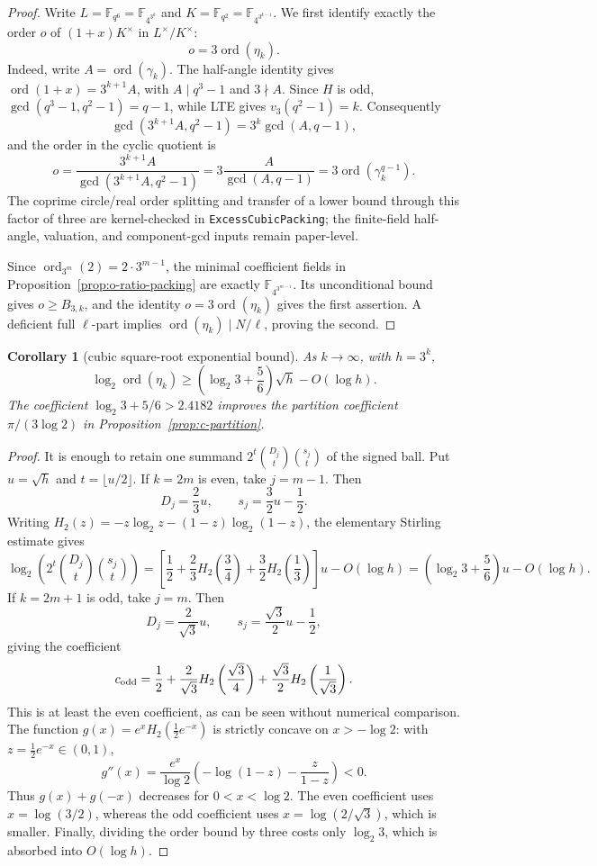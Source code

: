 \documentclass[11pt]{article}
\newtheorem{corollary}[theorem]{Corollary}
\theoremstyle{definition}
\theoremstyle{remark}
\begin{document}
\begin{proof}
Write $L=\mathbb F_{q^6}=\mathbb F_{4^{3^k}}$ and
$K=\mathbb F_{q^2}=\mathbb F_{4^{3^{k-1}}}$.  We first identify exactly
the order $o$ of $(1+x)K^\times$ in $L^\times/K^\times$:
\[
 o=3\operatorname{ord}(\eta_k).
\]
Indeed, write $A=\operatorname{ord}(\gamma_k)$.  The half-angle identity
gives $\operatorname{ord}(1+x)=3^{k+1}A$, with
$A\mid q^3-1$ and $3\nmid A$.  Since $H$ is odd,
$\gcd(q^3-1,q^2-1)=q-1$, while LTE gives
$v_3(q^2-1)=k$.  Consequently
\[
 \gcd(3^{k+1}A,q^2-1)=3^k\gcd(A,q-1),
\]
and the order in the cyclic quotient is
\[
 o=\frac{3^{k+1}A}{\gcd(3^{k+1}A,q^2-1)}
   =3\frac A{\gcd(A,q-1)}
   =3\operatorname{ord}(\gamma_k^{q-1}).
\]
The coprime circle/real order splitting and transfer of a lower bound
through this factor of three are kernel-checked in
\texttt{ExcessCubicPacking}; the finite-field half-angle, valuation, and
component-gcd inputs remain paper-level.

Since $\operatorname{ord}_{3^m}(2)=2\cdot3^{m-1}$, the minimal
coefficient fields in Proposition~\ref{prop:o-ratio-packing} are exactly
$\mathbb F_{4^{3^{m-1}}}$.  Its unconditional bound gives
$o\geq B_{3,k}$, and the identity $o=3\operatorname{ord}(\eta_k)$ gives the first
assertion.  A deficient full $\ell$-part implies
$\operatorname{ord}(\eta_k)\mid N/\ell$, proving the second.
\end{proof}

\begin{corollary}[cubic square-root exponential bound]
\label{cor:c-ratio-growth}
As $k\to\infty$, with $h=3^k$,
\[
 \log_2\operatorname{ord}(\eta_k)
 \geq\left(\log_2 3+\frac56\right)\sqrt h-O(\log h).
\]
The coefficient $\log_2 3+5/6>2.4182$ improves the partition coefficient
$\pi/(3\log 2)$ in Proposition~\ref{prop:c-partition}.
\end{corollary}

\begin{proof}
It is enough to retain one summand
$2^t\binom{D_j}t\binom{s_j}t$ of the signed ball.
Put $u=\sqrt h$ and $t=\lfloor u/2\rfloor$.
If $k=2m$ is even, take $j=m-1$.  Then
\[
 D_j=\frac23u,\qquad s_j=\frac32u-\frac12.
\]
Writing $H_2(z)=-z\log_2z-(1-z)\log_2(1-z)$, the elementary
Stirling estimate gives
\[
 \log_2\left(2^t\binom{D_j}t\binom{s_j}t\right)
 =\left[\frac12+\frac23H_2\left(\frac34\right)
              +\frac32H_2\left(\frac13\right)\right]u-O(\log h)
 =\left(\log_2 3+\frac56\right)u-O(\log h).
\]
If $k=2m+1$ is odd, take $j=m$.  Then
\[
 D_j=\frac2{\sqrt3}u,\qquad
 s_j=\frac{\sqrt3}2u-\frac12,
\]
giving the coefficient
\[
 c_{\rm odd}=\frac12+
 \frac2{\sqrt3}H_2\left(\frac{\sqrt3}4\right)
 +\frac{\sqrt3}2H_2\left(\frac1{\sqrt3}\right).
\]
This is at least the even coefficient, as can be seen without numerical
comparison.  The function
$g(x)=e^xH_2(\tfrac12e^{-x})$ is strictly concave on $x>-\log2$:
with $z=\tfrac12e^{-x}\in(0,1)$,
\[
 g''(x)=\frac{e^x}{\log2}
 \left(-\log(1-z)-\frac z{1-z}\right)<0.
\]
Thus $g(x)+g(-x)$ decreases for $0<x<\log2$.
The even coefficient uses $x=\log(3/2)$, whereas the odd coefficient
uses $x=\log(2/\sqrt3)$, which is smaller.
Finally, dividing the order bound by three costs only $\log_2 3$,
which is absorbed into $O(\log h)$.
\end{proof}
\end{document}
